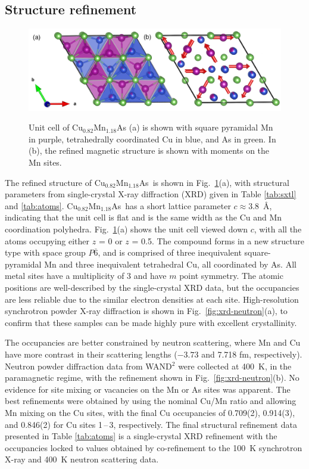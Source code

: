 \documentclass[10pt,doublespacing,edeposit]{uiucthesis2020}
\newcommand*{\cumnas}{Cu$_{0.82}$Mn$_{1.18}$As}
\begin{document}
\begin{mainmatter}
\subsection{Structure refinement}

\begin{figure}
\centering\includegraphics[width=\columnwidth]{figures/ch5/h-cumnas_1x1_cells_v2.png} \\
\caption{\label{fig:unitcell}
Unit cell of Cu$_{0.82}$Mn$_{1.18}$As (a) is shown with square pyramidal Mn in purple, tetrahedrally coordinated Cu in blue, and As in green.
In (b), the refined magnetic structure is shown with moments on the Mn sites.
} 
\end{figure}

The refined structure of \cumnas\ is shown in Fig.\ \ref{fig:unitcell}(a), with structural parameters from single-crystal X-ray diffraction (XRD) given in Table \ref{tab:sxtl} and \ref{tab:atoms}.
{\color{black}\cumnas\ has a short lattice parameter $c \approx 3.8$~\AA, indicating that the unit cell is flat and is the same width as the Cu and Mn coordination polyhedra. Fig.\ \ref{fig:unitcell}(a) shows the unit cell viewed down $c$, with all the atoms occupying either $z$ = 0 or $z$ = 0.5.}
The compound forms in a new structure type with space group $P\overline{6}$, and is comprised of three inequivalent square-pyramidal Mn and three inequivalent tetrahedral Cu, all coordinated by As.
All metal sites have a multiplicity of 3 {\color{black} and have $m$ point symmetry}. The atomic positions are well-described by the single-crystal XRD data, but the occupancies are less reliable due to the similar electron densities at each site.  
High-resolution synchrotron powder X-ray diffraction is shown in Fig.\ \ref{fig:xrd-neutron}(a), to confirm that these samples can be made highly pure with excellent crystallinity.

The occupancies are better constrained by neutron scattering, where Mn and Cu have more contrast in their scattering lengths ($-3.73$ and 7.718 fm, respectively).\cite{sears_neutron_1992}
Neutron powder diffraction data from WAND$^2$ were collected at 400~K, in the paramagnetic regime, with the refinement shown in Fig.\ \ref{fig:xrd-neutron}(b). 
No evidence for site mixing or vacancies on the Mn or As sites was apparent. 
The best refinements were obtained by using the nominal Cu/Mn ratio and allowing Mn mixing on the Cu sites, with the final Cu occupancies of 0.709(2), 0.914(3), and 0.846(2) for Cu sites 1\,--\,3, respectively.
The final structural refinement data presented in Table \ref{tab:atoms} is a single-crystal XRD refinement with the occupancies locked to values obtained by co-refinement to the 100~K synchrotron X-ray and 400~K neutron scattering data. 


\end{mainmatter}
\end{document}
